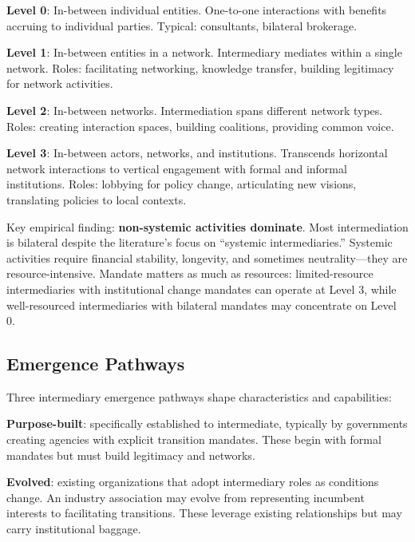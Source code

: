 \documentclass[../main.tex]{subfiles}
\begin{document}
\textbf{Level 0}: In-between individual entities. One-to-one interactions with benefits accruing to individual parties. Typical: consultants, bilateral brokerage.

\textbf{Level 1}: In-between entities in a network. Intermediary mediates within a single network. Roles: facilitating networking, knowledge transfer, building legitimacy for network activities.

\textbf{Level 2}: In-between networks. Intermediation spans different network types. Roles: creating interaction spaces, building coalitions, providing common voice.

\textbf{Level 3}: In-between actors, networks, and institutions. Transcends horizontal network interactions to vertical engagement with formal and informal institutions. Roles: lobbying for policy change, articulating new visions, translating policies to local contexts.

Key empirical finding: \textbf{non-systemic activities dominate}. Most intermediation is bilateral despite the literature's focus on ``systemic intermediaries.'' Systemic activities require financial stability, longevity, and sometimes neutrality---they are resource-intensive. Mandate matters as much as resources: limited-resource intermediaries with institutional change mandates can operate at Level 3, while well-resourced intermediaries with bilateral mandates may concentrate on Level 0.

\subsection{Emergence Pathways}

Three intermediary emergence pathways shape characteristics and capabilities:

\textbf{Purpose-built}: specifically established to intermediate, typically by governments creating agencies with explicit transition mandates. These begin with formal mandates but must build legitimacy and networks.

\textbf{Evolved}: existing organizations that adopt intermediary roles as conditions change. An industry association may evolve from representing incumbent interests to facilitating transitions. These leverage existing relationships but may carry institutional baggage.
\end{document}
